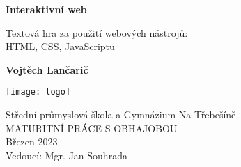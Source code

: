 \begin{titlepage}
    \begin{center}
        \vspace*{1cm}
            
        \Huge
        \textbf{Interaktivní web}
            
        \vspace{0.5cm}
        \LARGE
        Textová hra za použití webových nástrojů:\\ HTML, CSS, JavaScriptu
            
        \vspace{1.5cm}
            
        \textbf{Vojtěch Lančarič}
            
        \vfill
            
        \vspace{0.8cm}
            
        \texttt{[image: logo]}
            
        \Large
        Střední průmyslová škola a Gymnázium Na Třebešíně\\
	MATURITNÍ PRÁCE S OBHAJOBOU\\
        Březen 2023\\
	Vedoucí: Mgr. Jan Souhrada 
            
    \end{center}
\end{titlepage}
